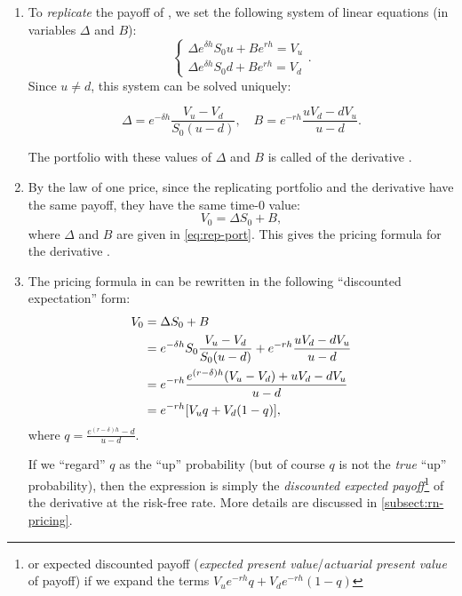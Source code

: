 \begin{enumerate}
\item \label{it:rep-port}
To \emph{replicate} the payoff of , we set the following
system of linear equations (in variables \(\Delta\) and \(B\)):
\[
\begin{cases}
\Delta e^{\delta h}S_0u+Be^{rh}=V_u\\
\Delta e^{\delta h}S_0d+Be^{rh}=V_d
\end{cases}.
\]
Since \(u\ne d\), this system can be solved uniquely:

\begin{equation}
\label{eq:rep-port}
\Delta=e^{-\delta h}\frac{V_u-V_d}{S_0(u-d)},\quad B=e^{-rh}\frac{uV_d-dV_u}{u-d}.
\end{equation}

The portfolio with these values of \(\Delta\) and \(B\) is called
 of the derivative .

\item \label{it:price-by-rep-fmla}
By the law of one price, since the replicating portfolio and the
derivative  have the same payoff, they have the same time-0 value:
\[
V_0=\Delta S_0+B,
\]
where \(\Delta\) and \(B\) are given in \cref{eq:rep-port}. This gives the
pricing formula for the derivative .

\item \label{it:price-by-rep-fmla-exp-form}
The pricing formula in  can be rewritten
in the following ``discounted expectation'' form:
\begin{align*}
V_0&=\Delta S_0+B\\
&=e^{-\delta h}S_0\frac{V_u-V_d}{S_0(u-d)}+e^{-rh}\frac{uV_d-dV_u}{u-d}\\
&=e^{-rh}\frac{e^{(r-\delta)h}(V_u-V_d)+uV_d-dV_u}{u-d}\\
&=e^{-rh}\qty[V_uq+V_d(1-q)],
\end{align*}
where \(\displaystyle q=\frac{e^{(r-\delta)h}-d}{u-d}\). 

If we ``regard'' \(q\) as the ``up'' probability (but of course \(q\) is not
the \emph{true} ``up'' probability), then the expression is simply the
\emph{discounted expected payoff}\footnote{or expected discounted payoff
(\emph{expected present value}/\emph{actuarial present value} of payoff) if we
expand the terms  \(V_ue^{-rh}q+V_de^{-rh}(1-q)\)} of the
derivative  at the risk-free rate. More details are discussed in
\cref{subsect:rn-pricing}.


\end{enumerate}
